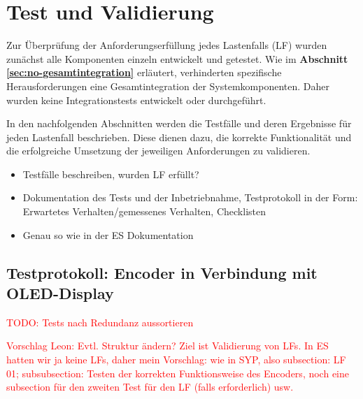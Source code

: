 \newpage
\section{Test und Validierung}
\label{sec:test-validation}
Zur Überprüfung der Anforderungserfüllung jedes Lastenfalls (LF) wurden zunächst alle Komponenten einzeln entwickelt und getestet. Wie im \textbf{Abschnitt \ref{sec:no-gesamtintegration}} erläutert, verhinderten spezifische Herausforderungen eine Gesamtintegration der Systemkomponenten. Daher wurden keine Integrationstests entwickelt oder durchgeführt.

In den nachfolgenden Abschnitten werden die Testfälle und deren Ergebnisse für jeden Lastenfall beschrieben. Diese dienen dazu, die korrekte Funktionalität und die erfolgreiche Umsetzung der jeweiligen Anforderungen zu validieren.


\begin{itemize}
    \item Testfälle beschreiben, wurden LF erfüllt?
    \item Dokumentation des Tests und der Inbetriebnahme, Testprotokoll in der Form: Erwartetes Verhalten/gemessenes Verhalten, Checklisten
    \item Genau so wie in der ES Dokumentation
\end{itemize}

\subsection{Testprotokoll: Encoder in Verbindung mit OLED-Display}


\textcolor{red}{TODO: Tests nach Redundanz aussortieren}

\textcolor{red}{Vorschlag Leon: Evtl. Struktur ändern? Ziel ist Validierung von LFs. In ES hatten wir ja keine LFs, daher mein Vorschlag: wie in SYP, also subsection: LF 01; subsubsection: Testen der korrekten Funktionsweise des Encoders, noch eine subsection für den zweiten Test für den LF (falls erforderlich) usw.}


